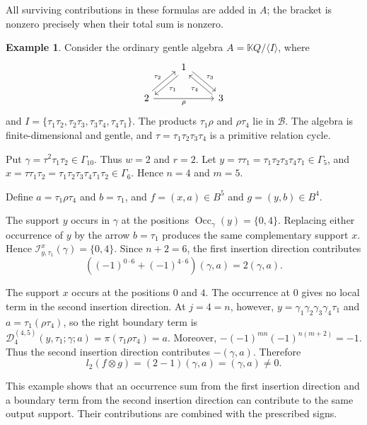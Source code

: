 \documentclass[11pt,a4paper,reqno]{amsart}
\newcommand{\mK}{\mathbb K}
\newcommand{\mB}{\mathcal B}
\newcommand{\mD}{\mathcal D}
\newcommand{\mI}{\mathcal I}
\newcommand{\Occ}{\operatorname{Occ}}
\newcommand{\para}[2]{(#1,#2)}
\theoremstyle{plain}
\theoremstyle{definition}
\newtheorem{example}[example]{Example}
\numberwithin{equation}{section}
\begin{document}
	All surviving contributions in these formulas are added in $A$; the bracket
	is nonzero precisely when their total sum is nonzero.
	\begin{example}
		\label{ex:suffix-arrow-reassembly}
		Consider the ordinary gentle algebra
		$A=\mK Q/\langle I\rangle$,
		where
		\[\begin{tikzcd}
			& 1 & \\
			2 && 3
			\arrow["{\tau_1}", shift left, from=1-2, to=2-1]
			\arrow["{\tau_3}", shift left, from=1-2, to=2-3]
			\arrow["{\tau_2}", shift left, from=2-1, to=1-2]
			\arrow["\rho"', from=2-1, to=2-3]
			\arrow["{\tau_4}", shift left, from=2-3, to=1-2]
		\end{tikzcd}\]
		and
		$I= \{ \tau_1\tau_2,  \tau_2\tau_3,  \tau_3\tau_4,  \tau_4\tau_1 \}$.
		The products
		$\tau_1\rho$ and $\rho\tau_4$
		lie in $\mB$.  The algebra is finite-dimensional and gentle, and
		$\tau=\tau_1\tau_2\tau_3\tau_4$
		is a primitive relation cycle.
		
		Put
		$\gamma=\tau^2\tau_1\tau_2\in\Gamma_{10}$.
		Thus
		$w=2$ and $r=2$.
		Let
		$y=\tau\tau_1 = \tau_1\tau_2\tau_3\tau_4\tau_1 \in\Gamma_5$,
		and
		$x=\tau\tau_1\tau_2 = \tau_1\tau_2\tau_3\tau_4\tau_1\tau_2 \in\Gamma_6$.
		Hence
		$n=4$ and $m=5$.
		
		Define
		$a=\tau_1\rho\tau_4$ and $b=\tau_1$,
		and
		$f=\para{x}{a}\in B^5$ and $g=\para{y}{b}\in B^4$.
		
		The support $y$ occurs in $\gamma$ at the positions
		$\Occ_\gamma(y)=\{0,4\}$.
		Replacing either occurrence of $y$ by the arrow $b=\tau_1$ produces
		the same complementary support $x$.  Hence
		$\mI_{y,\tau_1}^{x}(\gamma)=\{0,4\}$.
		Since $n+2=6$, the first insertion direction contributes
		\[
		(
		(-1)^{0\cdot6}+(-1)^{4\cdot6}
		)\para{\gamma}{a}
		=
		2\para{\gamma}{a}.
		\]
		
		The support $x$ occurs at the positions $0$ and $4$.  The occurrence
		at $0$ gives no local term in the second insertion direction.  At $j=4=n$, however, $y=\gamma_1\gamma_2\gamma_3\gamma_4\tau_1$ and $a=\tau_1(\rho\tau_4)$, so the right boundary term is $\mD_4^{(4,5)}(y,\tau_1;\gamma;a)=\pi(\tau_1\rho\tau_4)=a$.
		Moreover, $-(-1)^{mn}(-1)^{n(m+2)}=-1$.  Thus the second insertion direction contributes $-\para{\gamma}{a}$.
		Therefore
		\[
		l_2(f\otimes g)
		=
		(2-1)\para{\gamma}{a}
		=
		\para{\gamma}{a}
		\neq0.
		\]
		
		This example shows that an occurrence sum from the first insertion
		direction and a boundary term from the second insertion direction can
		contribute to the same output support. Their contributions are combined with the prescribed signs.
	\end{example}
\end{document}
